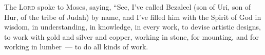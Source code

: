 
\begin{inparaenum}
     The \textsc{Lord} spoke to Moses, saying,%
     ``See, I've called Bezaleel (son of Uri, son of Hur, of the tribe of Judah) by name,%
     and I've filled him with the Spirit of God in wisdom, in understanding, in knowledge, in every work,%
     to devise artistic designs, to work with gold and silver and copper,%
     working in stone, for mounting, and for working in lumber~--- to do all kinds of work.%
    

\end{inparaenum}
